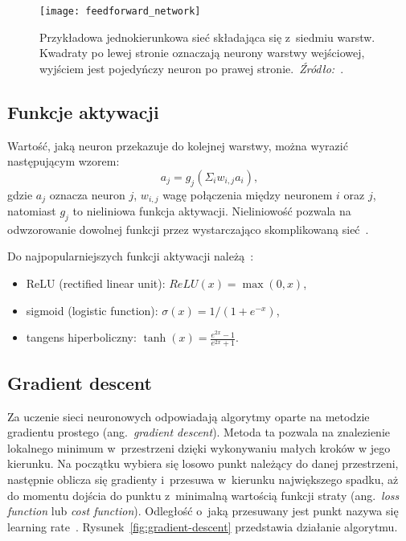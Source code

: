 \begin{figure}[h]
    \centering
    \texttt{[image: feedforward\_network]}
    \caption{Przykładowa jednokierunkowa sieć składająca się z~siedmiu warstw. Kwadraty po lewej stronie oznaczają neurony warstwy wejściowej, wyjściem jest pojedyńczy neuron po prawej stronie.~\textit{Źródło:~\cite{Russell2020}}.}
    \label{fig:feedforward-network}
\end{figure}

\subsection{Funkcje aktywacji}\label{subsec:funkcje-aktywacji}

Wartość, jaką neuron przekazuje do kolejnej warstwy, można wyrazić następującym wzorem:
\[a_{j} = g_{j}(\Sigma_{i}w_{i,j}a_{i}),\]
gdzie \(a_{j}\) oznacza neuron \(j\), \(w_{i,j}\) wagę połączenia między neuronem \(i\) oraz \(j\), natomiast \(g_{j}\) to nieliniowa funkcja aktywacji.
Nieliniowość pozwala na odwzorowanie dowolnej funkcji przez wystarczająco skomplikowaną sieć~\cite{Russell2020}.

Do najpopularniejszych funkcji aktywacji należą~\cite{Russell2020}:

\begin{itemize}
    \item ReLU (rectified linear unit): \(ReLU(x) = \max(0, x)\),
    \item sigmoid (logistic function): \(\sigma(x) = 1 / (1 + e^{-x})\),
    \item tangens hiperboliczny: \(\tanh(x) = \frac{e^{2x} - 1} {e^{2x} + 1}\).
\end{itemize}

\subsection{Gradient descent}\label{subsec:gradient-descent}

Za uczenie sieci neuronowych odpowiadają algorytmy oparte na metodzie gradientu prostego (ang.~\textit{gradient descent}).
Metoda ta pozwala na znalezienie lokalnego minimum w~przestrzeni dzięki wykonywaniu małych kroków w jego kierunku.
Na początku wybiera się losowo punkt należący do danej przestrzeni, następnie oblicza się gradienty i~przesuwa w~kierunku największego spadku, aż do momentu dojścia do punktu z~minimalną wartością funkcji straty (ang.~\textit{loss function} lub \textit{cost function}). Odległość o~jaką przesuwany jest punkt nazywa się learning rate~\cite{Russell2020}.
Rysunek~\ref{fig:gradient-descent} przedstawia działanie algorytmu.

